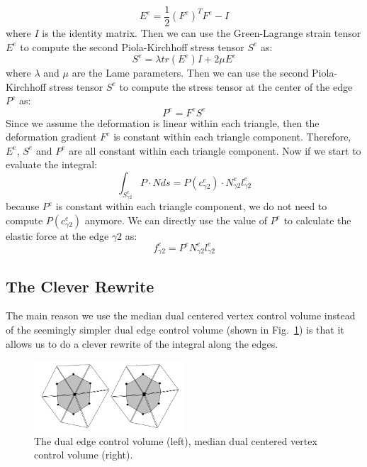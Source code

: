 \documentclass[acmtog]{acmart}
\begin{document}
\begin{equation*}
  E^e = \frac{1}{2} (F^e)^T F^e - I
\end{equation*}
where $I$ is the identity matrix. Then we can use the Green-Lagrange strain tensor $E^e$ to compute the second Piola-Kirchhoff stress tensor $S^e$ as:
\begin{equation*}
  S^e = \lambda tr(E^e) I + 2 \mu E^e
\end{equation*}
where $\lambda$ and $\mu$ are the Lame parameters. Then we can use the second Piola-Kirchhoff stress tensor $S^e$ to compute the stress tensor at the center of the edge $P^e$ as:
\begin{equation*}
  P^e = F^e S^e
\end{equation*}
Since we assume the deformation is linear within each triangle, then the deformation gradient $F^e$ is constant within each triangle component. Therefore, $E^e$, $S^e$ and $P^e$ are all constant within each triangle component. Now if we start to evaluate the integral:
\begin{equation*}
  \int_{S_{\gamma2}^e} P \cdot N ds = P(c_{\gamma2}^e) \cdot N_{\gamma2}^e l_{\gamma2}^e
\end{equation*}
because $P^e$ is constant within each triangle component, we do not need to compute $P(c_{\gamma2}^e)$ anymore. We can directly use the value of $P^e$ to calculate the elastic force at the edge $\gamma2$ as:
\begin{equation*}
  f_{\gamma2}^e = P^e N_{\gamma2}^e l_{\gamma2}^e
\end{equation*}

\subsection{The Clever Rewrite}
The main reason we use the median dual centered vertex control volume instead of the seemingly simpler dual edge control volume (shown in 
Fig.~\ref{fig:cv3}) is that it allows us to do a clever rewrite of the integral along the edges.

\begin{figure}[H]
  \centering
  \includegraphics[width=0.5\textwidth]{images/cv3.png}
  \caption{The dual edge control volume (left), median dual centered vertex control volume (right).}
  \label{fig:cv3}
\end{figure}
\end{document}
